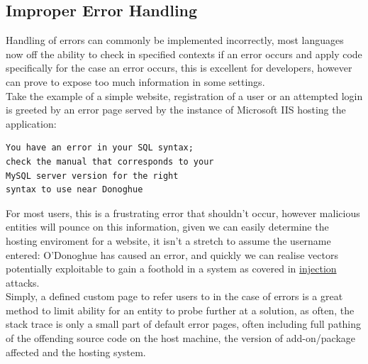 \documentclass{IEEEtran}
\begin{document}
        \subsection{Improper Error Handling}
            Handling of errors can commonly be implemented incorrectly, most languages now off the 
            ability to check in specified contexts if an error occurs and apply code specifically 
            for the case an error occurs, this is excellent for developers, however can prove to 
            expose too much information in some settings. 
            \medskip
            \\
            Take the example of a simple website, registration of a user or an attempted login is 
            greeted by an error page served by the instance of Microsoft IIS hosting the application:

            \begin{verbatim}
You have an error in your SQL syntax; 
check the manual that corresponds to your 
MySQL server version for the right 
syntax to use near Donoghue
            \end{verbatim}

            For most users, this is a frustrating error that shouldn't occur, however malicious 
            entities will pounce on this information, given we can easily determine the hosting
            enviroment for a website, it isn't a stretch to assume the username entered: O'Donoghue
            has caused an error, and quickly we can realise vectors potentially exploitable to gain
            a foothold in a system as covered in \hyperref[sec:injection]{\color{blue}injection} attacks.
            \medskip
            \\
            Simply, a defined custom page to refer users to in the case of errors is a great method
            to limit ability for an entity to probe further at a solution, as often, the stack trace
            is only a small part of default error pages, often including full pathing of the 
            offending source code on the host machine, the version of add-on/package affected and 
            the hosting system.
\end{document}
